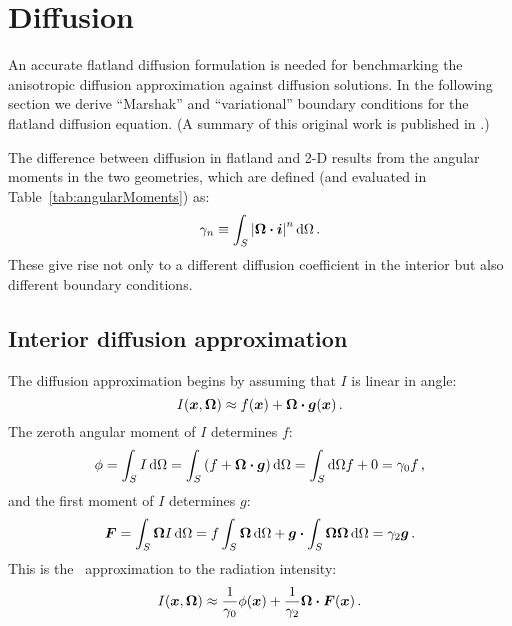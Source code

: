 \section{Diffusion}

An accurate flatland diffusion formulation
is needed for benchmarking the anisotropic diffusion
approximation against diffusion solutions.
In the following section we derive ``Marshak'' and ``variational'' boundary
conditions for the flatland diffusion equation. (A summary of this original
work is published in \cite{Joh2011a}.)

The difference between diffusion in flatland and 2-D results from the
angular moments in the two geometries, which
are defined (and evaluated in Table~\ref{tab:angularMoments}) as:
\begin{equation*}
  \gamma_n \equiv \int_S \left| \bm{\Omega} \bm{\cdot} \bm{i} \right|^n \mathop{}\!\mathrm{d}\Omega\,.
\end{equation*}
These give rise not only to a different diffusion coefficient in the interior
but also different boundary conditions.

\subsection{Interior diffusion approximation}

The diffusion approximation begins by assuming that $I$ is linear in angle:
\begin{equation*}
  I(\bm{x}, \bm{\Omega}) \approx f(\bm{x}) + \bm{\Omega} \bm{\cdot}
  \bm{g}(\bm{x})\,.
\end{equation*}
The zeroth angular moment of $I$ determines $f$:
\begin{equation*}
  \phi = \int_S I \mathop{}\!\mathrm{d}\Omega
= \int_S \left( f + \bm{\Omega}\bm{\cdot} \bm{g} \right) \mathop{}\!\mathrm{d}\Omega
= \int_S\mathop{}\!\mathrm{d}\Omega f + 0
= \gamma_0 f \,,
\end{equation*}
and the first moment of $I$ determines $g$:
\begin{equation*}
  \bm{F} = \int_S \bm{\Omega} I \mathop{}\!\mathrm{d}\Omega
= f \int_S \bm{\Omega} \mathop{}\!\mathrm{d}\Omega
  + \bm{g} \bm{\cdot} \int_S \bm{\Omega}\bm{\Omega} \mathop{}\!\mathrm{d}\Omega
= \gamma_2 \bm{g} \,.
\end{equation*}
This is the \Pone\ approximation to the radiation intensity:
\begin{equation}\label{eq:ssPone}
  I(\bm{x}, \bm{\Omega})
  \approx \frac{1}{\gamma_0} \phi(\bm{x})
  + \frac{1}{\gamma_2} \bm{\Omega} \bm{\cdot} \bm{F}(\bm{x})\,.
\end{equation}

